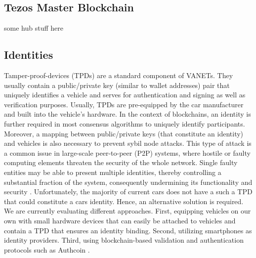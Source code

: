 \documentclass{llncs}
\begin{document}
{		%
		
		\subsection{Tezos Master Blockchain}
			\label{ss:blockchain-hubs}
			
			
			some hub stuff here
		


		\subsection{Identities}
			\label{ss:identities}
		
			Tamper-proof-devices (TPDs) are a standard component of VANETs. They usually contain a public/private key (similar to wallet addresses) pair that uniquely identifies a vehicle and serves for authentication and signing as well as verification purposes. Usually, TPDs are pre-equipped by the car manufacturer and built into the vehicle's hardware. In the context of blockchains, an identity is further required in most consensus algorithms to uniquely identify participants. Moreover, a mapping between public/private keys (that constitute an identity) and vehicles is also necessary to prevent sybil node attacks. 
			This type of attack is a common issue in large-scale peer-to-peer (P2P) systems, where hostile or faulty computing elements threaten the security of the whole network. Single faulty entities may be able to present multiple identities, thereby controlling a substantial fraction of the system, consequently undermining its functionality and security \cite{douceur2002sybil}.	
			Unfortunately, the majority of current cars does not have a such a TPD that could constitute a cars identity. Hence, an alternative solution is required. We are currently evaluating different approaches. First, equipping vehicles on our own with small hardware devices that can easily be attached to vehicles and contain a TPD that ensures an identity binding. Second, utilizing smartphones as identity providers. Third, using blockchain-based validation and authentication protocols such as Authcoin  \cite{leiding2017securing}\cite{AuthcoinLeiding2016MCIS}\cite{leiding2017mapping}.
		
}
\end{document}
